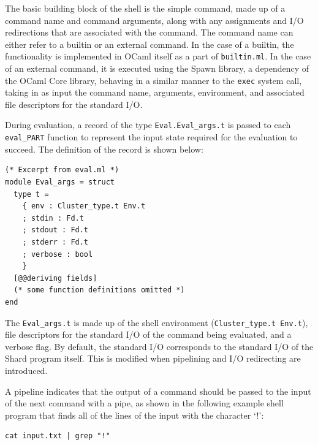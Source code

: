 \documentclass[twoside]{report}
\begin{document}

The basic building block of the shell is the simple command, made up of a command name and command arguments, along with any assignments and I/O redirections that are associated with the command.
The command name can either refer to a builtin or an external command.
In the case of a builtin, the functionality is implemented in OCaml itself as a part of \texttt{builtin.ml}.
In the case of an external command, it is executed using the Spawn library, a dependency of the OCaml Core library, behaving in a similar manner to the \texttt{exec} system call, taking in as input the command name, arguments, environment, and associated file descriptors for the standard I/O.

During evaluation, a record of the type \texttt{Eval.Eval\_args.t} is passed to each \texttt{eval\_PART} function to represent the input state required for the evaluation to succeed. The definition of the record is shown below:

\begin{minipage}[c]{\textwidth-15pt}
  \begin{lstlisting}
(* Excerpt from eval.ml *)
module Eval_args = struct
  type t =
    { env : Cluster_type.t Env.t
    ; stdin : Fd.t
    ; stdout : Fd.t
    ; stderr : Fd.t
    ; verbose : bool
    }
  [@@deriving fields]
  (* some function definitions omitted *)
end
\end{lstlisting}
  \smallskip
\end{minipage}

The \texttt{Eval\_args.t} is made up of the shell environment (\texttt{Cluster\_type.t Env.t}), file descriptors for the standard I/O of the command being evaluated, and a verbose flag.
By default, the standard I/O corresponds to the standard I/O of the Shard program itself.
This is modified when pipelining and I/O redirecting are introduced.

A pipeline indicates that the output of a command should be passed to the input of the next command with a pipe, as shown in the following example shell program that finds all of the lines of the input with the character `!':

\begin{minipage}[c]{\textwidth-15pt}
  \begin{lstlisting}[language=shard]
cat input.txt | grep "!"
\end{lstlisting}
  \smallskip
\end{minipage}
\end{document}
